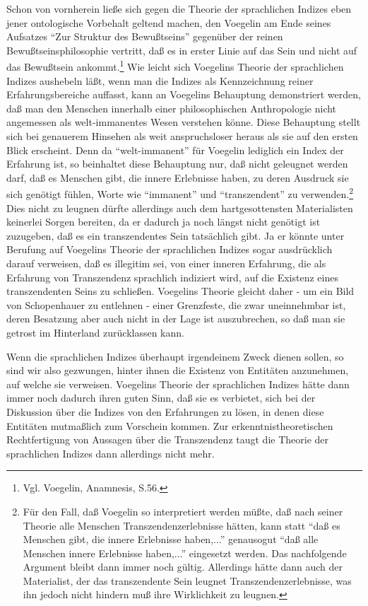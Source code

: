Schon von vornherein ließe sich gegen die Theorie der sprachlichen
Indizes eben jener ontologische Vorbehalt geltend machen, den Voegelin
am Ende seines Aufsatzes "`Zur Struktur des Bewußtseins"' gegenüber der
reinen Bewußtseinsphilosophie vertritt, daß es in erster Linie auf das
Sein und nicht auf das Bewußtsein ankommt.\footnote{Vgl. Voegelin,
  Anamnesis, S.56.} Wie leicht sich Voegelins Theorie der sprachlichen
Indizes aushebeln läßt, wenn man die Indizes als Kennzeichnung reiner
Erfahrungsbereiche auffasst, kann an Voegelins Behauptung demonstriert
werden, daß man den Menschen innerhalb einer philosophischen
Anthropologie nicht angemessen als welt-immanentes Wesen verstehen
könne. Diese Behauptung stellt sich bei genauerem Hinsehen als weit
anspruchsloser heraus als sie auf den ersten Blick erscheint. Denn da
"`welt-immanent"' für Voegelin lediglich ein Index der Erfahrung ist, so
beinhaltet diese Behauptung nur, daß nicht geleugnet werden darf, daß es
Menschen gibt, die innere Erlebnisse haben, zu deren Ausdruck sie sich
genötigt fühlen, Worte wie "`immanent"' und "`transzendent"' zu
verwenden.\footnote{Für den Fall, daß Voegelin so interpretiert werden
  müßte, daß nach seiner Theorie alle Menschen Transzendenzerlebnisse
  hätten, kann statt "`daß es Menschen gibt, die innere Erlebnisse
  haben,..."'  genausogut "`daß alle Menschen innere Erlebnisse
  haben,..."' eingesetzt werden. Das nachfolgende Argument bleibt dann
  immer noch gültig. Allerdings hätte dann auch der Materialist, der das
  transzendente Sein leugnet Transzendenzerlebnisse, was ihn jedoch
  nicht hindern muß ihre Wirklichkeit zu leugnen.} Dies nicht zu leugnen
dürfte allerdings auch dem hartgesottensten Materialisten keinerlei
Sorgen bereiten, da er dadurch ja noch längst nicht genötigt ist
zuzugeben, daß es ein transzendentes Sein tatsächlich gibt. Ja er könnte
unter Berufung auf Voegelins Theorie der sprachlichen Indizes sogar
ausdrücklich darauf verweisen, daß es illegitim sei, von einer inneren
Erfahrung, die als Erfahrung von Transzendenz sprachlich indiziert wird,
auf die Existenz eines transzendenten Seins zu schließen. Voegelins
Theorie gleicht daher - um ein Bild von Schopenhauer zu entlehnen -
einer Grenzfeste, die zwar uneinnehmbar ist, deren Besatzung aber auch
nicht in der Lage ist auszubrechen, so daß man sie getrost im Hinterland
zurücklassen kann.

Wenn die sprachlichen Indizes überhaupt irgendeinem Zweck dienen sollen,
so sind wir also gezwungen, hinter ihnen die Existenz von Entitäten
anzunehmen, auf welche sie verweisen. Voegelins Theorie der sprachlichen
Indizes hätte dann immer noch dadurch ihren guten Sinn, daß sie es verbietet,
sich bei der Diskussion über die Indizes von den Erfahrungen zu lösen, in
denen diese Entitäten mutmaßlich zum Vorschein kommen. Zur
erkenntnistheoretischen Rechtfertigung von Aussagen über die Transzendenz taugt
die Theorie der sprachlichen Indizes dann allerdings nicht mehr.

